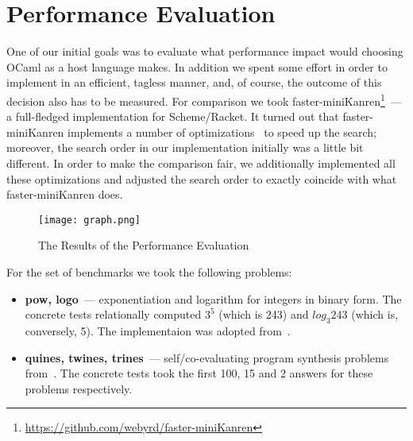 
\section{Performance Evaluation}
\label{sec:evaluation}

One of our initial goals was to evaluate what performance impact would choosing OCaml as a host language makes. In addition we spent some
effort in order to implement \miniKanren in an efficient, tagless manner, and, of course, the outcome of this decision also has to be
measured. For comparison we took faster-miniKanren\footnote{\url{https://github.com/webyrd/faster-miniKanren}}~--- a full-fledged
\miniKanren implementation for Scheme/Racket. It turned out that faster-miniKanren implements a number of optimizations~\cite{WillThesis, Optimizations}
to speed up the search; moreover, the search order in our implementation initially was a little bit different. In order to make the comparison
fair, we additionally implemented all these optimizations and adjusted the search order to exactly coincide with
what faster-miniKanren does.

\begin{figure}[t]
\centering
\texttt{[image: graph.png]}
\caption{The Results of the Performance Evaluation}
\label{eval}
\end{figure}

\FloatBarrier

For the set of benchmarks we took the following problems:

\begin{itemize}
\item \textbf{pow, logo}~--- exponentiation and logarithm for integers in binary form. The concrete tests relationally computed
$3^5$ (which is 243) and $log_3 243$ (which is, conversely, 5). The implementaion was adopted from~\cite{KiselyovArithm}.
\item \textbf{quines, twines, trines}~--- self/co-evaluating program synthesis problems from~\cite{Untagged}. The
concrete tests took the first 100, 15 and 2 answers for these problems respectively.
\end{itemize}


